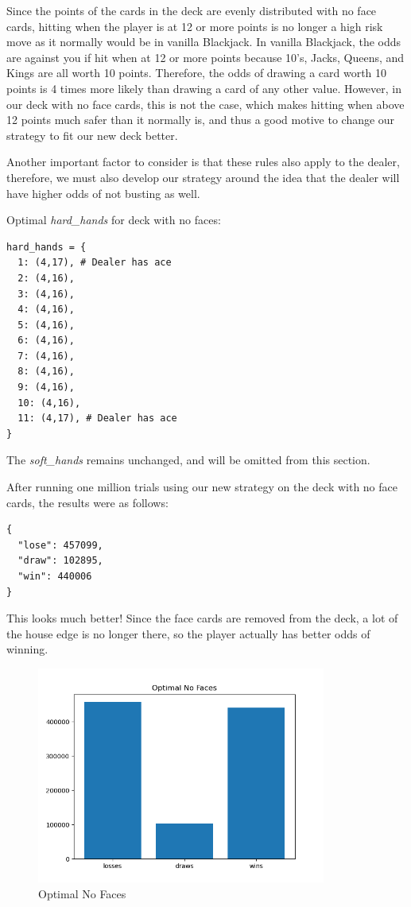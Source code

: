 \documentclass{article}
\begin{document}
{			Since the points of the cards in the deck are evenly distributed with no face cards, hitting when the player is at 12 or more points 
			is no longer a high risk move as it normally would be in vanilla Blackjack. In vanilla Blackjack, the odds are against you if hit when 
			at 12 or more points because 10's, Jacks, Queens, and Kings are all worth 10 points. Therefore, the odds of drawing a card worth 
			10 points is 4 times more likely than drawing a card of any other value. However, in our deck with no face cards, this is not the case,
			which makes hitting when above 12 points much safer than it normally is, and thus a good motive to change our strategy to fit our new
			deck better.

			Another important factor to consider is that these rules also apply to the dealer, therefore, we must also develop our strategy
			around the idea that the dealer will have higher odds of not busting as well.

       	\vspace{1cm} 
		Optimal \textit{hard\_hands} for deck with no faces:
        \begin{verbatim}
hard_hands = {
  1: (4,17), # Dealer has ace
  2: (4,16),
  3: (4,16),
  4: (4,16),
  5: (4,16),
  6: (4,16),
  7: (4,16),
  8: (4,16),
  9: (4,16),
  10: (4,16),
  11: (4,17), # Dealer has ace
}
        \end{verbatim}
		
		The \textit{soft\_hands} remains unchanged, and will be omitted from this section.

        After running one million trials using our new strategy on the deck with no face cards, the results
		were as follows:

        \begin{verbatim}
{
  "lose": 457099,
  "draw": 102895,
  "win": 440006
}
        \end{verbatim}

		This looks much better! Since the face cards are removed from the deck, a lot of the house edge is no longer there,
		so the player actually has better odds of winning.

		\begin{figure}[H]
			\hypertarget{fig4}{}
			\begin{center}
				\includegraphics[width=9.5cm]{optimal-no-faces.png}
			\end{center}
			\vspace{-10mm}
			\caption{Optimal No Faces}
		\end{figure}
        
}
\end{document}
